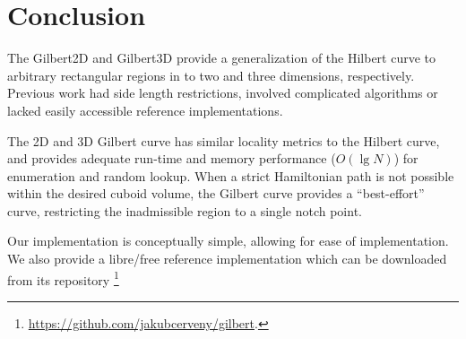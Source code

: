 \section{Conclusion}

The Gilbert2D and Gilbert3D provide a generalization of the Hilbert curve to
arbitrary rectangular regions in to two and three dimensions, respectively.
Previous work had side length restrictions, involved complicated algorithms or lacked
easily accessible reference implementations.

The 2D and 3D Gilbert curve has similar locality metrics to the Hilbert
curve, and provides adequate run-time and memory performance
($O(\lg N)$) for enumeration and random lookup.
When a strict Hamiltonian path is not possible within the desired cuboid volume, the
Gilbert curve provides a ``best-effort'' curve, restricting the inadmissible region
to a single notch point.

Our implementation is conceptually simple, allowing for ease of implementation.
We also provide a libre/free 
reference implementation which can be downloaded from
its repository \footnote{ \label{gilbert-url} \url{https://github.com/jakubcerveny/gilbert}. }




